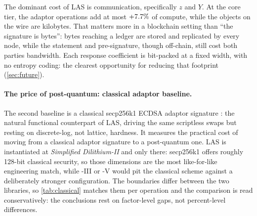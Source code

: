 The dominant cost of LAS is
communication, specifically $z$ and $Y$. At the core tier, the adaptor operations add
at most $+7.7\%$ of compute, while the objects on the wire are kilobytes. That matters more
in a blockchain setting than ``the signature is \sigBytesTarget{} bytes'': bytes reaching
a ledger are stored and replicated by every node, while the statement and pre-signature,
though off-chain, still cost both parties bandwidth. Each response coefficient is
bit-packed at a fixed width, with no entropy coding: the clearest opportunity for
reducing that footprint (\cref{sec:future}).

\paragraph{The price of post-quantum: classical adaptor baseline.}
The second baseline is a classical secp256k1 ECDSA adaptor signature
\cite{secp256k1zkp}: the natural functional counterpart of LAS, driving the same
scriptless swaps but resting on discrete-log, not lattice, hardness. It measures
the practical cost of moving from a classical adaptor signature to a post-quantum one.
LAS is instantiated at \emph{Simplified Dilithium-II} and only there: secp256k1 offers
roughly 128-bit classical security, so those dimensions are the most like-for-like
engineering match, while -III or -V would pit the classical scheme against a deliberately
stronger configuration. The boundaries differ between the two libraries, so
\cref{tab:classical} matches them per operation and the comparison is read
conservatively: the conclusions rest on factor-level gaps, not percent-level
differences.

